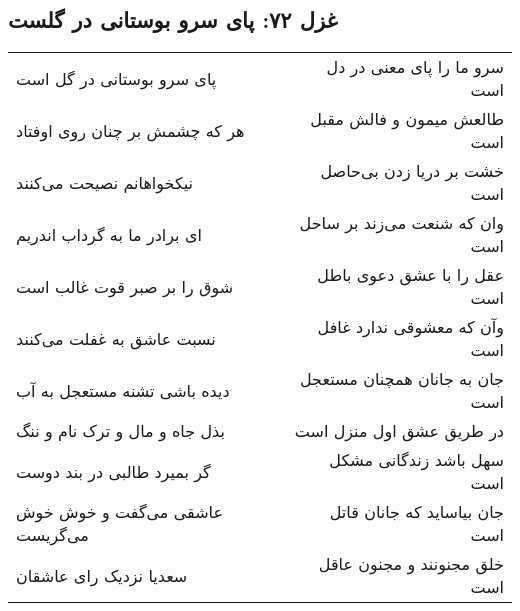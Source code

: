 \begin{center}
\section*{غزل ۷۲: پای سرو بوستانی در گلست}
\label{sec:072}
\begin{longtable}{l p{0.5cm} r}
پای سرو بوستانی در گل است
&&
سرو ما را پای معنی در دل است
\\
هر که چشمش بر چنان روی اوفتاد
&&
طالعش میمون و فالش مقبل است
\\
نیکخواهانم نصیحت می‌کنند
&&
خشت بر دریا زدن بی‌حاصل است
\\
ای برادر ما به گرداب اندریم
&&
وان که شنعت می‌زند بر ساحل است
\\
شوق را بر صبر قوت غالب است
&&
عقل را با عشق دعوی باطل است
\\
نسبت عاشق به غفلت می‌کنند
&&
وآن که معشوقی ندارد غافل است
\\
دیده باشی تشنه مستعجل به آب
&&
جان به جانان همچنان مستعجل است
\\
بذل جاه و مال و ترک نام و ننگ
&&
در طریق عشق اول منزل است
\\
گر بمیرد طالبی در بند دوست
&&
سهل باشد زندگانی مشکل است
\\
عاشقی می‌گفت و خوش خوش می‌گریست
&&
جان بیاساید که جانان قاتل است
\\
سعدیا نزدیک رای عاشقان
&&
خلق مجنونند و مجنون عاقل است
\\
\end{longtable}
\end{center}
